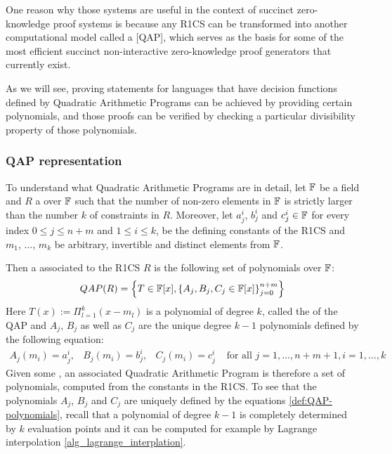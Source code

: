 One reason why those systems are useful in the context of succinct zero-knowledge proof systems is because any R1CS can be transformed into another computational model called a  [QAP], which serves as the basis for some of the most efficient succinct non-interactive zero-knowledge proof generators that currently exist. 

As we will see, proving statements for languages that have decision functions defined by Quadratic Arithmetic Programs can be achieved by providing certain polynomials, and those proofs can be verified by checking a particular divisibility property of those polynomials.
 
\subsubsection{QAP representation} To understand what Quadratic Arithmetic Programs are in detail, let $\mathbb{F}$ be a field and $R$ a  over $\mathbb{F}$ such that the number of non-zero elements in $\mathbb{F}$ is strictly larger than the number $k$ of constraints in $R$. Moreover, let $a_j^i$, $b_j^i$ and $c_j^i\in\mathbb{F}$ for every index $0\leq j \leq n+m$ and $1\leq i \leq k$, be the defining constants of the R1CS and $m_1$, $\ldots$, $m_k$ be arbitrary, invertible and distinct elements from $\mathbb{F}$.
  
Then a  associated to the R1CS $R$ is the following set of polynomials over $\mathbb{F}$:
\begin{equation}
\label{def:QAP-target-poly}
QAP(R) = \left\{T\in \mathbb{F}[x],\left\{A_j,B_j,C_j\in \mathbb{F}[x]\right\}_{j=0}^{n+m}\right\}
\end{equation}
Here $T(x) := \Pi_{l=1}^k (x- m_l)$ is a polynomial of degree $k$, called the  of the QAP and $A_j$, $B_j$ as well as $C_j$ are the unique degree $k-1$ polynomials defined by the following equation:
\begin{equation}
\label{def:QAP-polynomials}
\begin{array}{lllr}
A_j(m_i)=a_j^i, & B_j(m_i)=b_j^i, & C_j(m_i)=c_j^i & \text{ for all } j= 1, \ldots , n+m+1, i=1,\ldots,k 
\end{array}
\end{equation}
Given some , an associated Quadratic Arithmetic Program is therefore a set of polynomials, computed from the constants in the R1CS. To see that the polynomials $A_j$, $B_j$ and $C_j$ are uniquely defined by the equations \ref{def:QAP-polynomials}, recall that a polynomial of degree $k-1$ is completely determined by $k$ evaluation points and it can be computed for example by Lagrange interpolation \ref{alg_lagrange_interplation}.

